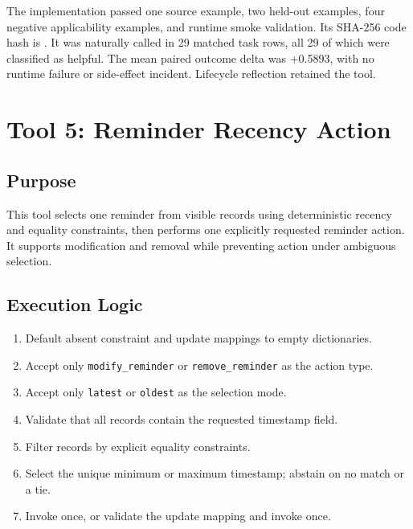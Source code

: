 The implementation passed one source example, two held-out examples,
four negative applicability examples, and runtime smoke validation. Its
SHA-256 code hash is
.
It was naturally called in 29 matched task rows, all 29 of which were
classified as helpful. The mean paired outcome delta was +0.5893, with
no runtime failure or side-effect incident. Lifecycle reflection
retained the tool.

\section{Tool 5: Reminder Recency Action}
\label{sec:appendix-recency-action-target}

\subsection{Purpose}\label{purpose-4}

This tool selects one reminder from visible records using deterministic
recency and equality constraints, then performs one explicitly requested
reminder action. It supports modification and removal while preventing
action under ambiguous selection.

\subsection{Execution Logic}\label{execution-logic-4}

\begin{enumerate}
\def\labelenumi{\arabic{enumi}.}
\tightlist
\item
  Default absent constraint and update mappings to empty dictionaries.
\item
  Accept only \texttt{modify\_reminder} or \texttt{remove\_reminder} as
  the action type.
\item
  Accept only \texttt{latest} or \texttt{oldest} as the selection mode.
\item
  Validate that all records contain the requested timestamp field.
\item
  Filter records by explicit equality constraints.
\item
  Select the unique minimum or maximum timestamp; abstain on no match or
  a tie.
\item
  Invoke  once, or validate the update mapping
  and invoke  once.
\end{enumerate}

